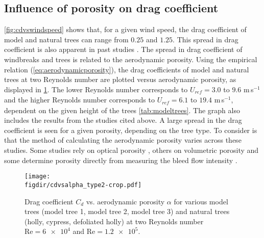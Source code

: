 \subsection{Influence of porosity on drag coefficient}
\label{subsec:porosity}
\cref{fig:cdvswindspeed} shows that, for a given wind speed, the drag coefficient of model and natural trees can range from $0.25$ and $1.25$. This spread in drag coefficient is also apparent in past studies \citep{Bitog2011,Dong2007,Guan2003,Hagen1971,Vollsinger2005a,Vollsinger2005,Wilson1985}. The spread in drag coefficient of windbreaks and trees is related to the aerodynamic porosity. Using the empirical relation (\cref{eq:aerodynamicporosity}), the drag coefficients of model and natural trees at two Reynolds number are plotted versus aerodynamic porosity, as displayed in \cref{fig:cdvsalpha}. The lower Reynolds number corresponds to $U_{\textit{ref}}=3.0$ to $9.6$ m\,s$^{-1}$ and the higher Reynolds number corresponds to $U_{\textit{ref}}=6.1$ to $19.4$ m\,s$^{-1}$, dependent on the given height of the trees \cref{tab:modeltrees}. The graph also includes the results from the studies cited above. A large spread in the drag coefficient is seen for a given porosity, depending on the tree type. To consider is that the method of calculating the aerodynamic porosity varies across these studies. Some studies rely on optical porosity \citep{Dong2008,Guan2003,Hagen1971,Wilson1985}, others on volumetric porosity \citep{Grant1998} and some determine porosity directly from measuring the bleed flow intensity \citep{Bitog2011}.

	\begin{figure}[t]
	\centering
	\texttt{[image: \\figdir/cdvsalpha\_type2-crop.pdf]}
	\caption{Drag coefficient $C_d$ vs. aerodynamic porosity $\alpha$ for various model trees (model tree 1, model tree 2, model tree 3) and natural trees (holly, cypress, defoliated holly) at two Reynolds number $\mathrm{Re} = \num{6e4}$ and $\mathrm{Re}=\num{1.2e5}$.}
	\label{fig:cdvsalpha}
	\end{figure}


